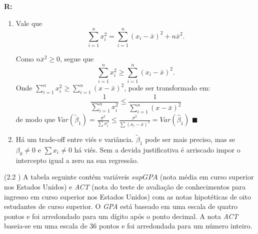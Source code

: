 \documentclass[12pt,letterpaper, onecolumn]{exam}
\renewenvironment{solution}
  {\par\noindent\textbf{R:}\enspace\color{blue}}
  {\par\color{black}}
\begin{document}
\begin{questions}
\begin{solution}
\begin{enumerate}[label = (\alph*)]
            Logo,
            \[
            \mathrm{Var}\left(
            \sum_{i=1}^n x_i u_i
            \;\middle|\;
            X
            \right)
            =
            \sigma^2 \sum_{i=1}^n x_i^2.
            \]
            
            Substituindo de volta,
            \[
            \mathrm{Var}(\tilde{\beta}_1 \mid X)
            =
            \frac{1}{\left(\sum_{i=1}^n x_i^2\right)^2}
            \left(
            \sigma^2 \sum_{i=1}^n x_i^2
            \right)
            =
            \frac{\sigma^2}{\sum_{i=1}^n x_i^2}.
            \]
            
            Portanto,
            \[
            \boxed{
            \mathrm{Var}(\tilde{\beta}_1 \mid X)
            =
            \frac{\sigma^2}{\sum_{i=1}^n x_i^2}
            }.
            \]
        \item Vale que
            \[
            \sum_{i=1}^n x_i^2
            =
            \sum_{i=1}^n (x_i-\bar{x})^2 + n\bar{x}^2.
            \]
            
            Como \(n\bar{x}^2 \geq 0\), segue que
            \[
            \sum_{i=1}^n x_i^2 \geq \sum_{i=1}^n (x_i-\bar{x})^2.
            \]
            Onde $\sum^n_{i = 1}x^2_i \geq \sum^n_{i=1}(x - \bar{x})^2$, pode ser transformado em:\[\frac{1}{\sum^n_{i = 1}x^2_i} \leq \frac{1}{\sum^n_{i=1}(x - \bar{x})^2}\]
            de modo que $Var(\tilde{\beta}_1) =\frac{\sigma^2}{\sum x_i^2} \le \frac{\sigma^2}{\sum (x_i-\bar x)^2} = Var(\hat{\beta}_1)$ \hfill $\blacksquare$
        \item Há um trade-off entre viés e variância. $\tilde \beta_1$ pode ser mais preciso, mas se $\beta_0 \neq 0$ e $\sum x_i \neq 0$ há viés. Sem a devida justificativa é arriscado impor o intercepto igual a zero na sua regressão.
        
    \end{enumerate}
\end{solution}



    \question (2.2 \citep{wooldridge2010}) A tabela seguinte contém variáveis $supGPA$ (nota média em curso superior nos Estados Unidos) e \textit{ACT} (nota do teste de avaliação de conhecimentos para ingresso em curso superior nos Estados Unidos) com as notas hipotéticas de oito estudantes de curso superior. O \textit{GPA} está baseado em uma escala de quatro pontos e foi arredondado para um dígito após o ponto decimal. A nota \textit{ACT} baseia-se em uma escala de 36 pontos e foi arredondada para um número inteiro.


\end{questions}
\end{document}
